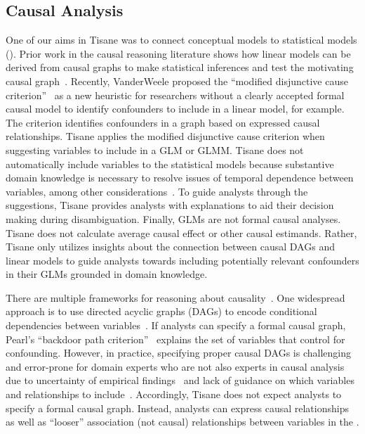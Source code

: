 \subsection{Causal Analysis}
One of our aims in Tisane was to connect conceptual models to statistical models
(\connectConceptualStats). Prior work in the causal reasoning literature shows
how linear models can be derived from causal graphs to make statistical
inferences and test the motivating causal
graph~\cite{spirtes1996using,spirtes1994conditional}. Recently, VanderWeele
proposed the ``modified disjunctive cause
criterion''~\cite{vanderweele2019modifiedDisjunctiveCriterion} as a new
heuristic for researchers without a clearly accepted formal causal model to
identify confounders to include in a linear model, for example. The criterion
identifies confounders in a graph based on expressed causal relationships.
Tisane applies the modified disjunctive cause criterion when suggesting
variables to include in a GLM or GLMM. Tisane does not automatically include
variables to the statistical models because substantive domain knowledge is
necessary to resolve issues of temporal dependence between variables, among
other considerations~\cite{vanderweele2019modifiedDisjunctiveCriterion}. To
guide analysts through the suggestions, Tisane provides analysts with
explanations to aid their decision making during disambiguation. Finally, GLMs
are not formal causal analyses. Tisane does not calculate average causal effect
or other causal estimands. Rather, Tisane only utilizes insights about the
connection between causal DAGs and linear models to guide analysts towards
including potentially relevant confounders in their GLMs grounded in domain
knowledge. 

There are multiple frameworks for
reasoning about causality~\cite{rubin2004teaching,pearl1995causal}. One
widespread approach is to use directed acyclic graphs (DAGs) to encode
conditional dependencies between
variables~\cite{pearl1995doCalculus,greenland1999causal,spirtes1994conditional,spirtes1996using}.
If analysts can specify a formal causal graph, Pearl's ``backdoor path
criterion''~\cite{pearl1995causal,pearl2000models} explains the set of variables
that control for confounding. However, in practice, specifying proper causal
DAGs is challenging and error-prone for domain experts who are not also experts
in causal analysis~\cite{suzuki2020causal} due to uncertainty of empirical
findings~\cite{suzuki2018mechanisms} and lack of guidance on which variables and
relationships to include~\cite{velentgas2013developing}. Accordingly, Tisane
does not expect analysts to specify a formal causal graph. Instead, analysts can
express causal relationships as well as ``looser'' association (not causal)
relationships between variables in the \SDSLlong.
